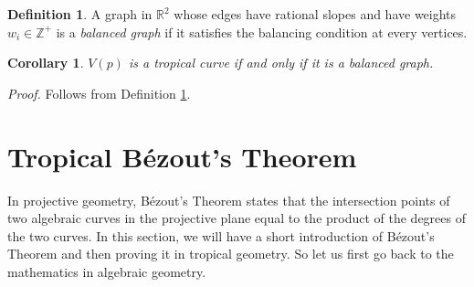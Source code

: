\documentclass[]{article}
\theoremstyle{definition}
\numberwithin{equation}{section}
\newtheorem{cor}[thm]{Corollary}
\newtheorem{defn}[thm]{Definition}
\renewcommand{\.}{\,.}
\begin{document}
\begin{defn}\label{sarah}
	A graph in $\mathbb{R}^2$ whose edges have rational slopes and have weights $w_i\in\mathbb{Z}^+$ is a \emph{balanced graph} if it satisfies the balancing condition at every vertices.
\end{defn}
\begin{cor} \label{sarahs}
	\emph{$V(p)$ is a tropical curve if and only if it is a balanced graph.} \end{cor}\vspace{-5mm}
\hspace{3mm} \emph{Proof.} Follows from Definition \ref{sarah}.
\newpage
\section{Tropical B\'ezout's Theorem}
\hspace{3mm}In projective geometry, B\'ezout's Theorem states that the intersection points of two algebraic curves in the projective plane equal to the product of the degrees of the two curves. In this section, we will have a short introduction of B\'ezout's Theorem and then proving it in tropical geometry. So let us first go back to the mathematics in algebraic geometry.
\end{document}
